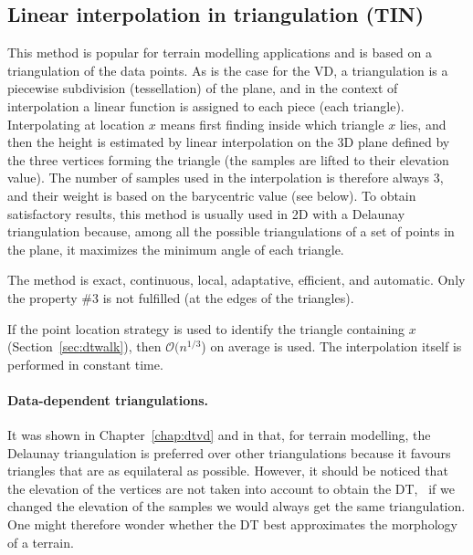 \subsection{Linear interpolation in triangulation (\textbf{TIN})}

This method is popular for terrain modelling applications and is based on a triangulation of the data points. 
As is the case for the VD, a triangulation is a piecewise subdivision (tessellation) of the plane, and in the context of interpolation a linear function is assigned to each piece (each triangle). 
Interpolating at location $x$ means first finding inside which triangle $x$ lies, and then the height is estimated by linear interpolation on the 3D plane defined by the three vertices forming the triangle (the samples are lifted to their elevation value). 
The number of samples used in the interpolation is therefore always 3, and their weight is based on the barycentric value (see below).
To obtain satisfactory results, this method is usually used in 2D with a Delaunay triangulation because, among all the possible triangulations of a set of points in the plane, it maximizes the minimum angle of each triangle. 

The method is exact, continuous, local, adaptative, efficient, and automatic.
Only the property \#3 is not fulfilled (at the edges of the triangles).

If the point location strategy is used to identify the triangle containing $x$ (Section~\ref{sec:dtwalk}), then $\mathcal{O}(n^{1/3}$) on average is used.
The interpolation itself is performed in constant time.


\paragraph{Data-dependent triangulations.}
It was shown in Chapter~\ref{chap:dtvd} and in  that, for terrain modelling, the Delaunay triangulation is preferred over other triangulations because it favours triangles that are as equilateral as possible.
However, it should be noticed that the elevation of the vertices are not taken into account to obtain the DT, \ie\ if we changed the elevation of the samples we would always get the same triangulation.
One might therefore wonder whether the DT best approximates the morphology of a terrain.

